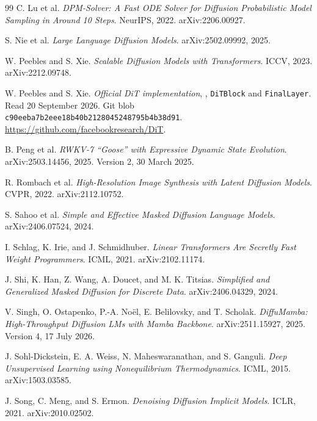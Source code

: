 \documentclass{article}
\theoremstyle{remark}\newtheorem{remark}[theorem]{Remark}
\begin{document}
\begin{thebibliography}{99}
 C. Lu et al. \emph{DPM-Solver: A Fast ODE Solver for Diffusion Probabilistic Model Sampling in Around 10 Steps}. NeurIPS, 2022. arXiv:2206.00927.

 S. Nie et al. \emph{Large Language Diffusion Models}. arXiv:2502.09992, 2025.

 W. Peebles and S. Xie. \emph{Scalable Diffusion Models with Transformers}. ICCV, 2023. arXiv:2212.09748.

 W. Peebles and S. Xie. \emph{Official DiT implementation}, , \texttt{DiTBlock} and \texttt{FinalLayer}. Read 20 September 2026. Git blob \texttt{c90eeba7b2eee18b40b2128045248795b4b38d91}. \url{https://github.com/facebookresearch/DiT}.

 B. Peng et al. \emph{RWKV-7 ``Goose'' with Expressive Dynamic State Evolution}. arXiv:2503.14456, 2025. Version 2, 30 March 2025.

 R. Rombach et al. \emph{High-Resolution Image Synthesis with Latent Diffusion Models}. CVPR, 2022. arXiv:2112.10752.

 S. Sahoo et al. \emph{Simple and Effective Masked Diffusion Language Models}. arXiv:2406.07524, 2024.

 I. Schlag, K. Irie, and J. Schmidhuber. \emph{Linear Transformers Are Secretly Fast Weight Programmers}. ICML, 2021. arXiv:2102.11174.

 J. Shi, K. Han, Z. Wang, A. Doucet, and M. K. Titsias. \emph{Simplified and Generalized Masked Diffusion for Discrete Data}. arXiv:2406.04329, 2024.

 V. Singh, O. Ostapenko, P.-A. No\"el, E. Belilovsky, and T. Scholak. \emph{DiffuMamba: High-Throughput Diffusion LMs with Mamba Backbone}. arXiv:2511.15927, 2025. Version 4, 17 July 2026.

 J. Sohl-Dickstein, E. A. Weiss, N. Maheswaranathan, and S. Ganguli. \emph{Deep Unsupervised Learning using Nonequilibrium Thermodynamics}. ICML, 2015. arXiv:1503.03585.

 J. Song, C. Meng, and S. Ermon. \emph{Denoising Diffusion Implicit Models}. ICLR, 2021. arXiv:2010.02502.


\end{thebibliography}
\end{document}
